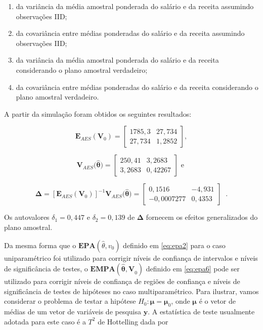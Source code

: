 \documentclass[]{book}
\numberwithin{example}{chapter}
\numberwithin{remark}{chapter}
\numberwithin{definition}{chapter}
\begin{document}
\begin{enumerate}
\def\labelenumi{\arabic{enumi}.}
\item
  da variância da média amostral ponderada do salário e da receita
  assumindo observações IID;
\item
  da covariância entre médias ponderadas do salário e da receita
  assumindo observações IID;
\item
  da variância da média amostral ponderada do salário e da receita
  considerando o plano amostral verdadeiro;
\item
  da covariância entre médias ponderadas do salário e da receita
  considerando o plano amostral verdadeiro.
\end{enumerate}

A partir da simulação foram obtidos os seguintes resultados:

\begin{equation}
\mathbf{E}_{AES}\left( \mathbf{V}_{0}\right) =\left[ 
\begin{array}{rr}
1785,3 & 27,734 \\ 
27,734 & 1,2852
\end{array}
\right],  \label{eq:epa8}
\end{equation}

\begin{equation}
\mathbf{V}_{AES}(\mathbf{\hat{\theta})=}\left[ 
\begin{array}{rr}
250,41 & 3,2683 \\ 
3,2683 & 0,42267
\end{array}
\right] \mbox{ e }  \label{eq:epa9}
\end{equation}

\begin{equation}
\mathbf{\Delta =}\left[ \mathbf{E}_{AES}\left( \mathbf{V}_{0}\right) \right]
^{-1}\mathbf{V}_{AES}(\mathbf{\hat{\theta})=}\left[ 
\begin{array}{rr}
0,1516 & -4,931 \\ 
-0,0007277 & 0,4353
\end{array}
\right] \;\;.  \label{eq:epa10}
\end{equation}

Os autovalores \(\delta_{1}=0,447\) e \(\delta_{2}=0,139\) de
\(\mathbf{\Delta}\) fornecem os efeitos generalizados do plano amostral.

Da mesma forma que o \(\mathbf{EPA}\left( \hat{\theta},v_{0}\right)\)
definido em \eqref{eq:epa2} para o caso uniparamétrico foi utilizado para
corrigir níveis de confiança de intervalos e níveis de significância de
testes, o \(\mathbf{EMPA}(\mathbf{\hat{\theta},V}_{0})\) definido em
\eqref{eq:epa6} pode ser utilizado para corrigir níveis de confiança de
regiões de confiança e níveis de significância de testes de hipóteses no
caso multiparamétrico. Para ilustrar, vamos considerar o problema de
testar a hipótese \(H_{0}:\mathbf{\mu }=\mathbf{\mu }_{0}\), onde
\(\mathbf{\mu }\) é o vetor de médias de um vetor de variáveis de
pesquisa \(\mathbf{y}\). A estatística de teste usualmente adotada para
este caso é a \(T^{2}\) de Hottelling dada por
\end{document}
